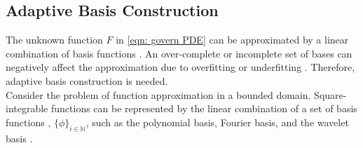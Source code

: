 %



\subsection{Adaptive Basis Construction}
\label{sec: adaptive basis review}

The unknown function $F$ in \eqref{eqn: govern PDE} can be approximated by a linear
combination of basis functions \cite{real analysis}. An over-complete or
incomplete set of bases can negatively affect the approximation due to overfitting or underfitting
\cite{regression book}.
Therefore, adaptive basis construction is needed.\\

Consider the problem of function approximation in a bounded domain. Square-integrable functions
can be represented by the linear combination of a set of basis functions \cite{real analysis},
$\{\phi\}_{i\in \mathbb{N}}$, such as 
the polynomial basis, Fourier basis, and the wavelet basis \cite{wavelet mallat}. 

